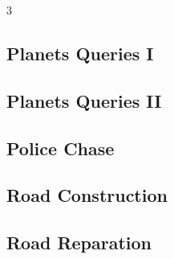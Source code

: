 \documentclass[8pt]{extarticle}
\begin{document}
\begin{multicols*}{3}
\subsection{Planets Queries I}
\begin{caixaenunciado}

\end{caixaenunciado}
\vspace{0.3cm}


\subsection{Planets Queries II}
\begin{caixaenunciado}

\end{caixaenunciado}
\vspace{0.3cm}


\subsection{Police Chase}
\begin{caixaenunciado}

\end{caixaenunciado}
\vspace{0.3cm}


\subsection{Road Construction}
\begin{caixaenunciado}

\end{caixaenunciado}
\vspace{0.3cm}


\subsection{Road Reparation}
\begin{caixaenunciado}

\end{caixaenunciado}
\vspace{0.3cm}



\end{multicols*}
\end{document}
